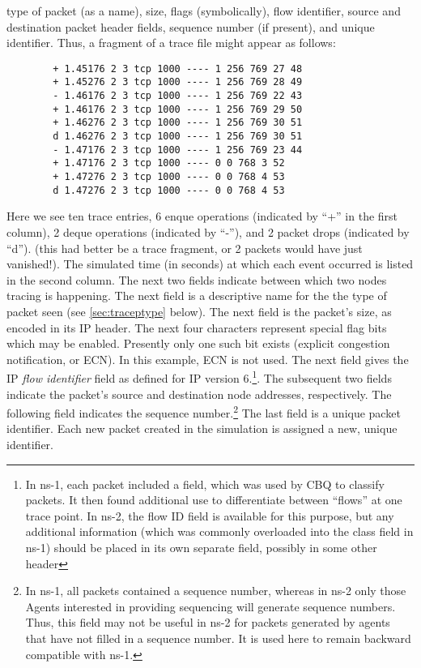 type of packet (as a name), size, flags (symbolically),
flow identifier, source and destination packet header fields,
sequence number (if present), and unique identifier.
Thus, a fragment of a trace file might appear as follows:
\begin{small}
\begin{verbatim}
        + 1.45176 2 3 tcp 1000 ---- 1 256 769 27 48
        + 1.45276 2 3 tcp 1000 ---- 1 256 769 28 49
        - 1.46176 2 3 tcp 1000 ---- 1 256 769 22 43
        + 1.46176 2 3 tcp 1000 ---- 1 256 769 29 50
        + 1.46276 2 3 tcp 1000 ---- 1 256 769 30 51
        d 1.46276 2 3 tcp 1000 ---- 1 256 769 30 51
        - 1.47176 2 3 tcp 1000 ---- 1 256 769 23 44
        + 1.47176 2 3 tcp 1000 ---- 0 0 768 3 52
        + 1.47276 2 3 tcp 1000 ---- 0 0 768 4 53
        d 1.47276 2 3 tcp 1000 ---- 0 0 768 4 53
\end{verbatim}
\end{small}
Here we see ten trace entries, 6 enque operations (indicated by ``+''
in the first column), 2 deque operations (indicated by ``-''),
and 2 packet drops (indicated by ``d'').
(this had better be a trace fragment, or 2 packets would have just vanished!).
The simulated time (in seconds) at which each event occurred is listed
in the second column.
The next two fields indicate between which two nodes tracing is happening.
The next field is a descriptive name for the the type of packet seen
(see \ref{sec:traceptype} below).
The next field is the packet's size, as encoded in its IP header.
The next four characters represent special flag bits which may be
enabled.  Presently only one such bit exists (explicit congestion
notification, or {\sf ECN}).  In this example, {\sf ECN} is not used.
The next field gives the IP {\em flow identifier} field as defined
for IP version 6.\footnote{In ns-1, each packet included a 
field, which was used by CBQ to classify packets.
It then found additional use to differentiate between
``flows'' at one trace point.  In ns-2, the flow ID field is available
for this purpose, but any additional information (which was commonly overloaded
into the class field in ns-1) should be placed in its own separate field,
possibly in some other header}.
The subsequent two fields indicate the packet's source and destination
node addresses, respectively.
The following field indicates the sequence number.\footnote{In ns-1,
all packets contained a sequence number, whereas in ns-2 only those
Agents interested in providing sequencing will generate sequence numbers.
Thus, this field may not be useful in ns-2 for packets generated by
agents that have not filled in a sequence number.  It is used here
to remain backward compatible with ns-1.}
The last field is a unique packet identifier.  Each new packet
created in the simulation is assigned a new, unique identifier.

